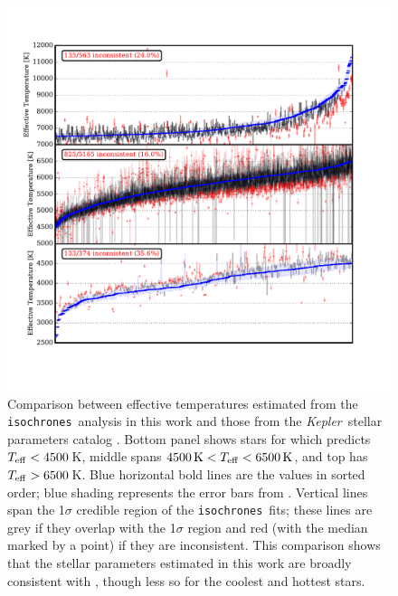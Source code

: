 \documentclass{emulateapj}
\newcommand{\figlabel}[1]{\label{fig:#1}}
\newcommand{\kepler}{\textit{Kepler}}
\newcommand{\isochrones}{\texttt{isochrones}}
\begin{document}
\begin{figure}[p]
\begin{center}
\includegraphics[width=7in]{figures/hubercompare_teff.pdf}
\end{center}
\caption{Comparison between effective temperatures estimated from the
  \isochrones\ analysis in this work and those from the
  \kepler\ stellar parameters catalog \citep[][hereafter
    ]{Huber:2014}.  Bottom panel shows stars
  for which  predicts $T_{\rm eff} < 4500$\,K,
  middle spans $4500\,{\rm K} < T_{\rm eff} < 6500\,{\rm K}$, and top
  has $T_{\rm eff} > 6500$\,K. Blue horizontal bold lines are the
   values in sorted order; blue shading
  represents the error bars from .  Vertical
  lines span the 1$\sigma$ credible region of the \isochrones\ fits;
  these lines are grey if they overlap with the
   1$\sigma$ region and red (with the median
  marked by a point) if they are inconsistent.  This comparison shows
  that the stellar parameters estimated in this work are broadly
  consistent with , though less so for the
  coolest and hottest stars.
\figlabel{starsteff}}
\end{figure}
\end{document}
